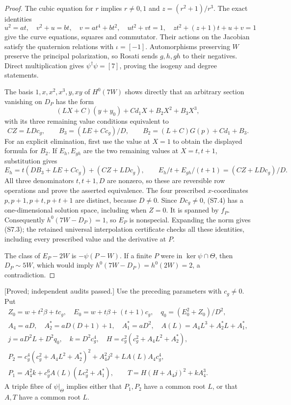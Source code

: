 \begin{proof}
The cubic equation for $r$ implies $r\ne0,1$ and $z=(r^2+1)/r^3$.
The exact identities
\[
 u^2=at,\quad v^2+u=bt,\quad v=at^4+bt^2,
 \quad ut^2+vt=1,\quad zt^2+(z+1)t+u+v=1
\]
give the curve equations, squares and commutator. Their actions on the
Jacobian satisfy the quaternion relations with $\iota=[-1]$.
Automorphisms preserving $W$ preserve the principal polarization, so
Rosati sends $g,h,gh$ to their negatives. Direct multiplication gives
$\psi^\dagger\psi=[7]$, proving the isogeny and degree statements.

The basis $1,x,x^2,x^3,y,xy$ of $H^0(7W)$ shows directly that an
arbitrary section vanishing on $D_P$ has the form
\[
 (LX+C)(y+y_0)+Cd_1X+B_2X^2+B_3X^3,
\]
with its three remaining value conditions equivalent to
\[
 CZ=LDc_g,\qquad
 B_3=(LE+Cc_g)/D,\qquad
 B_2=(L+C)G(p)+Cd_1+B_3.                         \tag{S7.4}
\]
For an explicit elimination, first use the value at $X=1$ to obtain
the displayed formula for $B_2$. If $E_h,E_{gh}$ are the two
remaining values at $X=t,t+1$, substitution gives
\[
 E_h=t(DB_3+LE+Cc_g)+(CZ+LDc_g),\qquad
 E_h/t+E_{gh}/(t+1)=(CZ+LDc_g)/D.
\]
All three denominators $t,t+1,D$ are nonzero, so these are reversible
row operations and prove the asserted equivalence.
The four prescribed $x$-coordinates $p,p+1,p+t,p+t+1$ are distinct,
because $D\ne0$. Since $Dc_g\ne0$, (S7.4) has a one-dimensional
solution space, including when $Z=0$. It is spanned by $f_P$.
Consequently $h^0(7W-D_P)=1$, so $E_P$ is nonspecial.
Expanding the norm gives (S7.3); the retained universal interpolation
certificate checks all these identities, including every prescribed
value and the derivative at $P$.

The class of $E_P-2W$ is $-\psi(P-W)$. If a finite $P$ were in
$\ker\psi\cap\Theta$, then $D_P\sim5W$, which would imply
$h^0(7W-D_P)=h^0(2W)=2$, a contradiction.
\end{proof}

\begin{lemma}
\label{lem:uniform-seven-triple-obstruction-candidate}
\textup{[Proved; independent audits passed.]}
Use the preceding parameters with $c_g\ne0$. Put
\[
\begin{gathered}
 Z_0=w+t^2\beta+tc_g,\quad
 E_0=w+t\beta+(t+1)c_g,\quad q_0=(E_0^2+Z_0)/D^2,\\
 A_4=aD,\quad A_2^*=aD(D+1)+1,\quad A_1^*=aD^2,
 \quad A(L)=A_4L^3+A_2^*L+A_1^*,\\
 j=aD^2L+D^2q_0,\quad k=D^2c_g^4,\quad
 H=c_g^2(c_g^2+A_4L^2+A_2^*),\\
 P_2=c_g^4(c_g^2+A_4L^2+A_2^*)^2+A_4^2j^2
                         +LA(L)A_4c_g^4,\\
 P_1=A_4^2k+c_g^6A(L)(Lc_g^2+A_1^*),\qquad
 T=H(H+A_4j)^2+kA_4^3.
\end{gathered}                                                   \tag{S7.5}
\]
A triple fibre of $\psi|_\Theta$ implies either that $P_1,P_2$
have a common root $L$, or that $A,T$ have a common root $L$.
\end{lemma}

